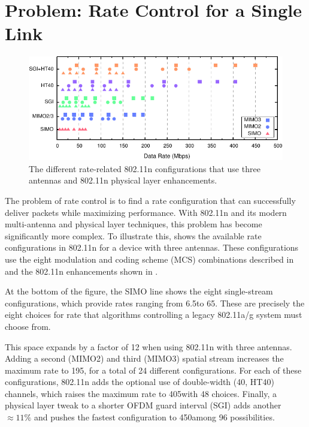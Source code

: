 \section{Problem: Rate Control for a Single Link}
\begin{figure}[t]
	\centering
	\includegraphics[width=\textwidth]{figures/approach/rate_configs.pdf}
	\caption[The rate-related 802.11n configurations that use three antennas]{\label{fig:rate_configs}The different rate-related 802.11n configurations that use three antennas and 802.11n physical layer enhancements.}
\end{figure}

The problem of rate control is to find a rate configuration that can successfully deliver packets while maximizing performance.  With 802.11n and its modern multi-antenna and physical layer techniques, this problem has become significantly more complex. To illustrate this,  shows the available rate configurations in 802.11n for a device with three antennas. These configurations use the eight modulation and coding scheme (MCS) combinations described in  and the 802.11n enhancements shown in .

At the bottom of the figure, the SIMO line shows the eight single-stream configurations, which provide rates ranging from 6.5\Mbps to 65\Mbps. These are precisely the eight choices for rate that algorithms controlling a legacy 802.11a/g system must choose from.

This space expands by a factor of 12 when using 802.11n with three antennas. Adding a second (MIMO2) and third (MIMO3) spatial stream increases the maximum rate to 195\Mbps, for a total of 24 different configurations. For each of these configurations, 802.11n adds the optional use of double-width (40\MHz, HT40) channels, which raises the maximum rate to 405\Mbps with 48 choices. Finally, a physical layer tweak to a shorter OFDM guard interval (SGI) adds another $\approx 11\%$ and pushes the fastest configuration to 450\Mbps among 96 possibilities.

